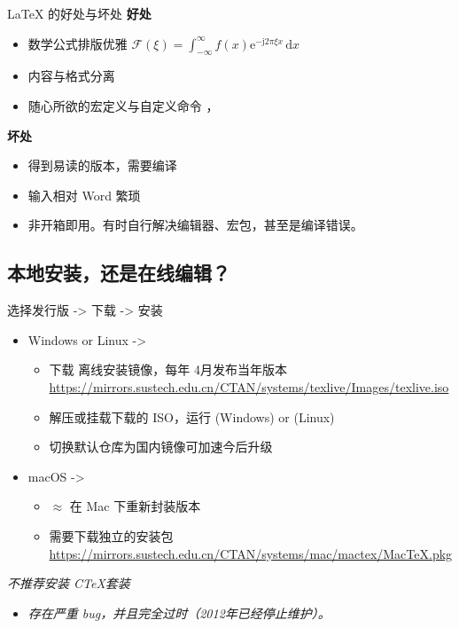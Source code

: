 \begin{frame}[fragile]{\LaTeX{} 的好处与坏处}
    \textbf{好处}
    \begin{itemize}
        \item 数学公式排版优雅 \quad $\mathcal{F}(\xi)=\int_{-\infty}^{\infty} f(x)\mathrm{e}^{-\mathrm{j}2\pi \xi x}\,\mathrm{d}x$
        \item 内容与格式分离
        \item 随心所欲的宏定义与自定义命令 ，
    \end{itemize}

    \vspace{2em}
    \textbf{坏处}
    \begin{itemize}
        \item 得到易读的版本，需要编译
        \item 输入相对 Word 繁琐
        \item 非开箱即用。有时自行解决编辑器、宏包，甚至是编译错误。
    \end{itemize}

\end{frame}

\subsection{本地安装，还是在线编辑？}

\begin{frame}[fragile]{选择发行版 -> 下载 -> 安装}
  \begin{itemize}
    \item Windows or Linux -> \texlive
      \begin{itemize}
        \item 下载 \texlive 离线安装镜像，每年 4月发布当年版本 \url{https://mirrors.sustech.edu.cn/CTAN/systems/texlive/Images/texlive.iso}
        \item 解压或挂载下载的 ISO，运行  (Windows) or  (Linux)
        \item 切换默认仓库为国内镜像可加速今后升级
      \end{itemize}
    \item macOS -> \mactex
      \begin{itemize}
        \item $\approx$ \texlive 在 Mac 下重新封装版本
        \item 需要下载独立的安装包 \url{https://mirrors.sustech.edu.cn/CTAN/systems/mac/mactex/MacTeX.pkg}
      \end{itemize}
\end{itemize}
    \emph{不推荐安装 C\TeX 套装}
    \begin{itemize}
        \item \emph{存在严重 bug，并且完全过时（2012年已经停止维护）。}
    \end{itemize}
\end{frame}

